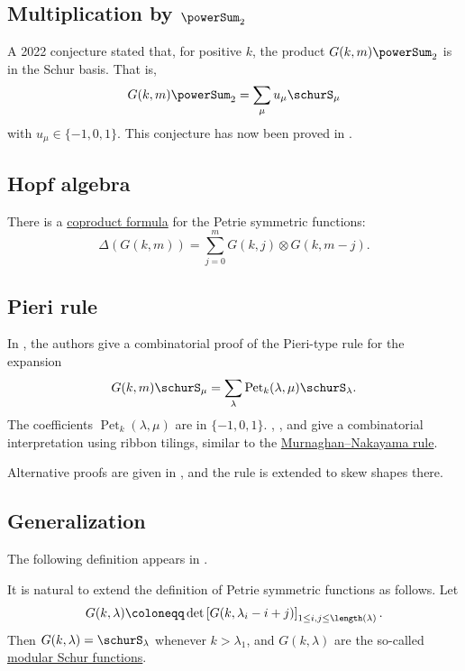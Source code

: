 \subsection[petrieMN]{Multiplication by $\powerSum_2$}

A 2022 conjecture stated that, for positive $k$, the product
$G(k,m)\powerSum_2$ is  in the Schur basis.
That is,
\[
G(k,m) \powerSum_2 = \sum_\mu u_\mu \schurS_\mu
\]
with $u_\mu \in \{-1,0,1\}$.
This conjecture has now been proved in \cite[Thm.~1.5]{ChengChouEuFuYao2022x}.


\subsection[petrieHopf]{Hopf algebra}

There is a \hyperref[hopfAlgebra]{coproduct formula} for the Petrie symmetric
functions:
\[
\Delta( G(k,m) ) = \sum_{j=0}^m  G(k,j) \otimes G(k,m-j).
\]


\subsection[pieriPetrie]{Pieri rule}

In \cite{JinJingLiu2024x}, the authors give a combinatorial proof of
the Pieri-type rule for the expansion
\[
 G(k,m) \schurS_\mu
 =
 \sum_\lambda \operatorname{Pet}_k(\lambda,\mu) \schurS_\lambda.
\]
The coefficients $\operatorname{Pet}_k(\lambda,\mu)$ are in $\{-1,0,1\}$.
, , and  give a
combinatorial interpretation using ribbon tilings, similar to the
\hyperref[murnaghanNakayamaRule]{Murnaghan--Nakayama rule}.


Alternative proofs are given in \cite{WuEuKuShih2025x}, and the rule is
extended to skew shapes there.


\subsection[petrieDeterminant]{Generalization}

The following definition appears in \cite[Eq.~(3.20)]{DotyWalker1992}.

It is natural to extend the definition of Petrie symmetric functions as follows.
Let
\[
G(k,\lambda)
\coloneqq
\det\left[ G(k, \lambda_i-i+j) \right]_{1\leq i,j \leq \length(\lambda)}.
\]
Then $G(k,\lambda) = \schurS_\lambda$ whenever $k > \lambda_1$,
and $G(k,\lambda)$ are the so-called \hyperref[modularSchur]{modular Schur functions}.

